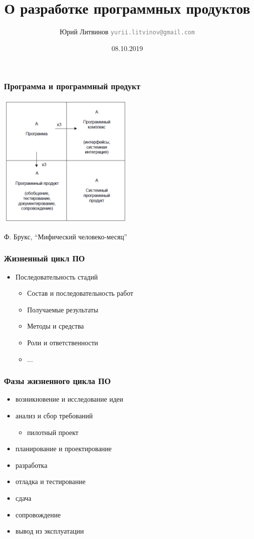 \documentclass[xetex,mathserif,serif]{beamer}
\title{О разработке программных продуктов}
\author[Юрий Литвинов]{Юрий Литвинов \newline \textcolor{gray}{\small\texttt{yurii.litvinov@gmail.com}}}
\date{08.10.2019}
\begin{document}
	
	\frame{\titlepage}
	
	\begin{frame}
		\frametitle{Программа и программный продукт}
		\begin{center}
			\includegraphics[width=0.5\textwidth]{mythical-man-month.png}
		\end{center}
		\begin{center}
			Ф. Брукс, ``Мифический человеко-месяц''
		\end{center}
	\end{frame}

	\begin{frame}
		\frametitle{Жизненный цикл ПО}
		\begin{itemize}
			\item Последовательность стадий
			\begin{itemize}
				\item Состав и последовательность работ
				\item Получаемые результаты
				\item Методы и средства
				\item Роли и ответственности
				\item ...
			\end{itemize}
		\end{itemize}
	\end{frame}

	\begin{frame}
		\frametitle{Фазы жизненного цикла ПО}
		\begin{itemize}
			\item возникновение и исследование идеи
			\item анализ и сбор требований
			\begin{itemize}
				\item пилотный проект
			\end{itemize}
			\item планирование и проектирование
			\item разработка
			\item отладка и тестирование
			\item сдача
			\item сопровождение
			\item вывод из эксплуатации
		\end{itemize}
	\end{frame}
\end{document}
